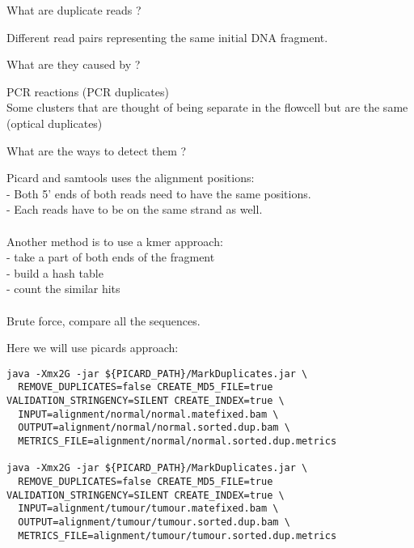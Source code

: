 \begin{question}
What are duplicate reads ?
\end{question}
\begin{answer}
Different read pairs representing the same initial DNA fragment.
\end{answer}

\begin{question} 
What are they caused by ?
\end{question}
\begin{answer}
PCR reactions (PCR duplicates) \\
Some clusters that are thought of being separate in the flowcell but are the same (optical duplicates)
\end{answer}

\begin{question} 
What are the ways to detect them ?
\end{question}
\begin{answer}
Picard and samtools uses the alignment positions: \\
   - Both 5' ends of both reads need to have the same positions. \\ 
   - Each reads have to be on the same strand as well. \\ \\
Another method is to use a kmer approach: \\
   - take a part of both ends of the fragment \\
   - build a hash table  \\
   - count the similar hits \\ \\
Brute force, compare all the sequences.
\end{answer}

Here we will use picards approach:
\begin{lstlisting}
java -Xmx2G -jar ${PICARD_PATH}/MarkDuplicates.jar \
  REMOVE_DUPLICATES=false CREATE_MD5_FILE=true VALIDATION_STRINGENCY=SILENT CREATE_INDEX=true \
  INPUT=alignment/normal/normal.matefixed.bam \
  OUTPUT=alignment/normal/normal.sorted.dup.bam \
  METRICS_FILE=alignment/normal/normal.sorted.dup.metrics

java -Xmx2G -jar ${PICARD_PATH}/MarkDuplicates.jar \
  REMOVE_DUPLICATES=false CREATE_MD5_FILE=true VALIDATION_STRINGENCY=SILENT CREATE_INDEX=true \
  INPUT=alignment/tumour/tumour.matefixed.bam \
  OUTPUT=alignment/tumour/tumour.sorted.dup.bam \
  METRICS_FILE=alignment/tumour/tumour.sorted.dup.metrics
\end{lstlisting}


